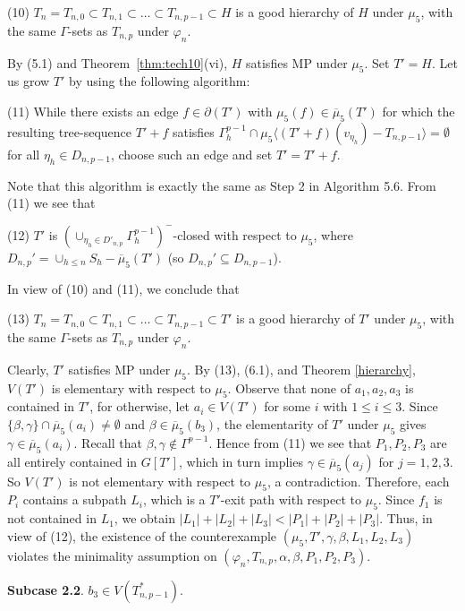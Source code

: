 \documentclass[11pt]{article}
\begin{document}
(10) $T_n=T_{n,0} \subset T_{n,1} \subset \ldots \subset T_{n,p-1} \subset H$ is a good hierarchy of 
$H$ under $\mu_5$, with the same $\Gamma$-sets as $T_{n,p}$ under $\varphi_n$. 

By (5.1) and Theorem~\ref{thm:tech10}(vi), $H$ satisfies MP under $\mu_5$.  Set $T'=H$. Let us grow $T'$
by using the following algorithm: 

(11) While there exists an edge $f\in\partial(T')$ with $\mu_5(f)\in\overline{\mu}_5(T')$ for which the
resulting tree-sequence $T'+f$ satisfies
$\Gamma^{p-1}_h \cap \mu_5 \langle (T'+f)(v_{\eta_h})-T_{n,p-1} \rangle =\emptyset$ for all
$\eta_h \in D_{n,p-1}$, choose such an edge and set $T'=T'+f$. 

Note that this algorithm is exactly the same as Step 2 in Algorithm 5.6. From (11) we see that

(12)  $T'$ is $(\cup_{\eta_h\in D'_{n,p}}\Gamma^{p-1}_h)^-$-closed with respect to $\mu_5$, where $D_{n,p}'=\cup_{h\leq n}S_h -\overline{\mu}_5(T')$ (so $D_{n,p}' \subseteq D_{n,p-1}$). 

In view of (10) and (11), we conclude that

(13) $T_n=T_{n,0} \subset T_{n,1} \subset \ldots \subset T_{n,p-1} \subset T'$ is a good hierarchy of $T'$ under 
$\mu_5$, with the same $\Gamma$-sets as $T_{n,p}$ under $\varphi_n$. 

Clearly, $T'$ satisfies MP under $\mu_5$. By (13), (6.1), and Theorem \ref{hierarchy}, $V(T')$ is elementary with 
respect to $\mu_5$. Observe that none of $a_1,a_2,a_3$ is contained in $T'$, for otherwise, let $a_i \in V(T')$ for
some $i$ with $1\le i \le 3$. Since $\{\beta,\gamma\}\cap \overline{\mu}_5(a_i) \ne \emptyset$ and
$\beta \in \overline{\mu}_5(b_3)$, the elementarity of $T'$ under $\mu_5$ gives
$\gamma \in \overline{\mu}_5(a_i)$. Recall that $\beta,\gamma\notin\Gamma^{p-1}$. Hence from (11) we see that
$P_1,P_2,P_3$ are all entirely contained in $G[T']$, which in turn implies $\gamma \in \overline{\mu}_5(a_j)$ 
for $j=1,2,3$. So $V(T')$ is not elementary with respect to $\mu_5$, a contradiction. Therefore, each $P_i$ contains a subpath 
$L_i$, which is a $T'$-exit path with respect to $\mu_5$. Since $f_1$ is not contained in $L_1$, we obtain $|L_1|+|L_2|+|L_3|<|P_1|+|P_2|+|P_3|$. 
Thus, in view of (12), the existence of the counterexample $(\mu_5, T', \gamma, 
\beta, L_1, L_2,L_3)$ violates the minimality assumption on $(\varphi_n, T_{n,p}, \alpha, \beta, P_1,P_2,P_3)$. 

{\bf Subcase 2.2}. $b_3\in V(T_{n,p-1}^*)$.	
	
\end{document}
